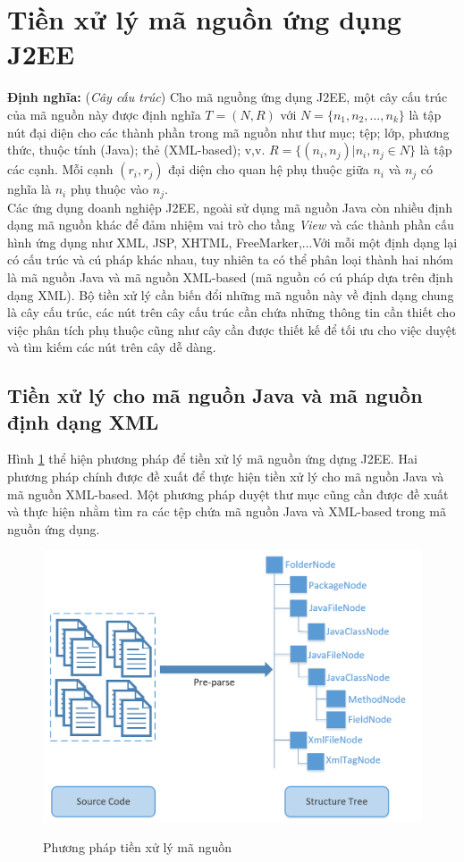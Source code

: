 \documentclass[12pt,a4paper]{report}
\begin{document}
\section{Tiền xử lý mã nguồn ứng dụng J2EE}
\textbf{Định nghĩa:} (\textit{Cây cấu trúc}) Cho mã nguồng ứng dụng J2EE, một cây cấu trúc của mã nguồn này được định nghĩa $T = (N, R)$ với $N = \{n_1, n_2,..., n_k\}$ là tập nút đại diện cho các thành phần trong mã nguồn như thư mục; tệp; lớp, phương thức, thuộc tính (Java); thẻ (XML-based); v,v. $R = \{(n_i, n_j) | n_i,n_j \in N\}$ là tập các cạnh. Mỗi cạnh $(r_i,r_j)$ đại diện cho quan hệ phụ thuộc giữa $n_i$ và $n_j$ có nghĩa là $n_i$ phụ thuộc vào $n_j$.\\

Các ứng dụng doanh nghiệp J2EE, ngoài sử dụng mã nguồn Java còn nhiều định dạng mã nguồn khác để đảm nhiệm vai trò cho tầng \textit{View} và các thành phần cấu hình ứng dụng như XML, JSP, XHTML, FreeMarker,...Với mỗi một định dạng lại có cấu trúc và cú pháp khác nhau, tuy nhiên ta có thể phân loại thành hai nhóm là mã nguồn Java và mã nguồn XML-based (mã nguồn có cú pháp dựa trên định dạng XML). Bộ tiền xử lý cần biến đổi những mã nguồn này về định dạng chung là cây cấu trúc, các nút trên cây cấu trúc cần chứa những thông tin cần thiết cho việc phân tích phụ thuộc cũng như cây cần được thiết kế để tối ưu cho việc duyệt và tìm kiếm các nút trên cây dễ dàng.\\

\subsection{Tiền xử lý cho mã nguồn Java và mã nguồn định dạng XML}
Hình \ref{fig:preprocess} thể hiện phương pháp để tiền xử lý mã nguồn ứng dựng J2EE. Hai phương pháp chính được đề xuất để thực hiện tiền xử lý cho mã nguồn Java và mã nguồn XML-based. Một phương pháp duyệt thư mục cũng cần được đề xuất và thực hiện nhằm tìm ra các tệp chứa mã nguồn Java và XML-based trong mã nguồn ứng dụng.\\

\begin{figure}[h]
	\centering
	\includegraphics[scale=0.5]{preprocess}
	\label{fig:preprocess}
	\caption{Phương pháp tiền xử lý mã nguồn}
\end{figure}
\end{document}
